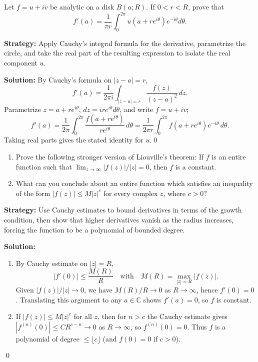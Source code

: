 \begin{problembox}
Let \( f = u + iv \) be analytic on a disk \( B(a; R) \). If \( 0 < r < R \), prove that
\[f'(a) = \frac{1}{\pi r} \int_0^{2\pi} u(a + re^{i\theta}) e^{-i\theta} d\theta.\]
\end{problembox}

\noindent\textbf{Strategy:} Apply Cauchy's integral formula for the derivative, parametrize the circle, and take the real part of the resulting expression to isolate the real component \( u \).

\bigskip\noindent\textbf{Solution:}
By Cauchy's formula on $|z-a|=r$,
\[f'(a)=\frac{1}{2\pi i}\int_{|z-a|=r} \frac{f(z)}{(z-a)^2}\,dz.\]
Parametrize $z=a+re^{i\theta}$, $dz=ire^{i\theta}d\theta$, and write $f=u+iv$;
\[f'(a)=\frac{1}{2\pi}\int_0^{2\pi} \frac{f(a+re^{i\theta})}{re^{i\theta}}\,d\theta=\frac{1}{2\pi r}\int_0^{2\pi} f(a+re^{i\theta})e^{-i\theta}\,d\theta.\]
Taking real parts gives the stated identity for $u$.\qed


\begin{problembox}
\begin{enumerate}[label=(\alph*)]
\item Prove the following stronger version of Liouville's theorem: If \( f \) is an entire function such that \( \lim_{z \to \infty} |f(z)|/|z| = 0 \), then \( f \) is a constant.
\item What can you conclude about an entire function which satisfies an inequality of the form \( |f(z)| \leq M|z|^c \) for every complex \( z \), where \( c > 0 \)?
\end{enumerate}
\end{problembox}

\noindent\textbf{Strategy:} Use Cauchy estimates to bound derivatives in terms of the growth condition, then show that higher derivatives vanish as the radius increases, forcing the function to be a polynomial of bounded degree.

\bigskip\noindent\textbf{Solution:}
\begin{enumerate}[label=(\alph*)]
\item By Cauchy estimate on $|z|=R$,
\[|f'(0)|\le \frac{M(R)}{R} \quad\text{with}\quad M(R)=\max_{|z|=R}|f(z)|.\]
Given $|f(z)|/|z|\to0$, we have $M(R)/R\to0$ as $R\to\infty$, hence $f'(0)=0$. Translating this argument to any $a\in\mathbb C$ shows $f'(a)=0$, so $f$ is constant.
\item If $|f(z)|\le M|z|^c$ for all $z$, then for $n>c$ the Cauchy estimate gives $|f^{(n)}(0)|\le C R^{c-n}\to0$ as $R\to\infty$, so $f^{(n)}(0)=0$. Thus $f$ is a polynomial of degree $\le \lfloor c\rfloor$ (and $f(0)=0$ if $c>0$).
\end{enumerate}\qed
